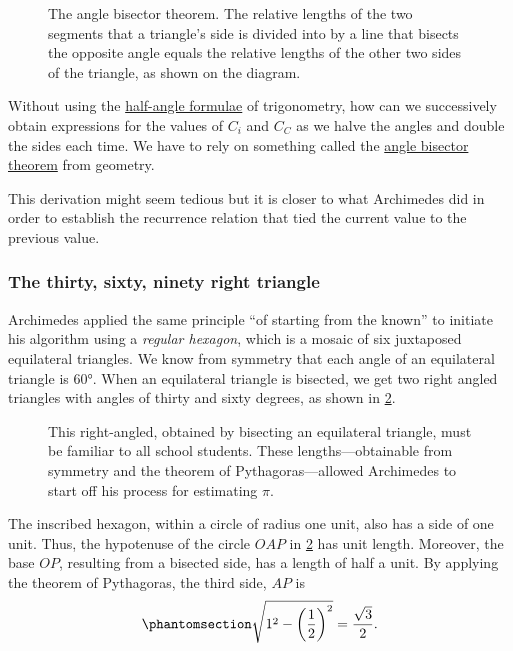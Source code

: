 \documentclass[
  a4paper,
]{article}
\begin{document}
\begin{figure}
\centering

\caption{The angle bisector theorem. The relative lengths of the two
segments that a triangle's side is divided into by a line that bisects
the opposite angle equals the relative lengths of the other two sides of
the triangle, as shown on the diagram.}\label{fig:angle-bisect}
\end{figure}

Without using the
\href{https://math.libretexts.org/Bookshelves/Algebra/Algebra_and_Trigonometry_1e_(OpenStax)/09:_Trigonometric_Identities_and_Equations/9.03:_Double-Angle_Half-Angle_and_Reduction_Formulas}{half-angle
formulae} of trigonometry, how can we successively obtain expressions
for the values of \(C_i\) and \(C_C\) as we halve the angles and double
the sides each time. We have to rely on something called the
\href{https://en.wikipedia.org/wiki/Angle_bisector_theorem}{angle
bisector theorem} from geometry.

This derivation might seem tedious but it is closer to what Archimedes
did in order to establish the recurrence relation that tied the current
value to the previous value.

\subsubsection{The thirty, sixty, ninety right
triangle}\label{the-thirty-sixty-ninety-right-triangle}

Archimedes applied the same principle ``of starting from the known'' to
initiate his algorithm using a \emph{regular hexagon}, which is a mosaic
of six juxtaposed equilateral triangles. We know from symmetry that each
angle of an equilateral triangle is \(60°\). When an equilateral
triangle is bisected, we get two right angled triangles with angles of
thirty and sixty degrees, as shown in \cref{fig:thirty-sixty}.

\begin{figure}
\centering

\caption{This right-angled, obtained by bisecting an equilateral
triangle, must be familiar to all school students. These
lengths---obtainable from symmetry and the theorem of
Pythagoras---allowed Archimedes to start off his process for estimating
\(\pi\).}\label{fig:thirty-sixty}
\end{figure}

The inscribed hexagon, within a circle of radius one unit, also has a
side of one unit. Thus, the hypotenuse of the circle \(OAP\) in
\cref{fig:thirty-sixty} has unit length. Moreover, the base \(OP\),
resulting from a bisected side, has a length of half a unit. By applying
the theorem of Pythagoras, the third side, \(AP\) is
\begin{equation}\phantomsection\label{eq:triangle}{
\sqrt{1^2 - \left(\frac{1}{2}\right)^2} = \frac{\sqrt{3}}{2}.
}\end{equation}
\end{document}
